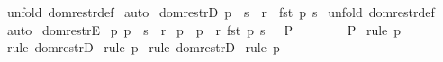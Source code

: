 \begin{isabellebody}
%
\isadelimproof
%
\endisadelimproof
%
\isatagproof
{}\isamarkupfalse%
\ {\isacharparenleft}unfold\ dom{\isacharunderscore}restr{\isacharunderscore}def{\isacharparenright}\isanewline
{}\isamarkupfalse%
\ auto\isanewline
{}\isamarkupfalse%
%
\endisatagproof
{\isafoldproof}%
%
\isadelimproof
\isanewline
%
\endisadelimproof
\isanewline
{}\isamarkupfalse%
\ dom{\isacharunderscore}restrD{}{\isacharcolon}\ {\isachardoublequoteopen}p\ {\isacharcolon}\ {\isacharparenleft}s\ {\isacharless}{\isacharcolon}\ r{\isacharparenright}\ {\isacharequal}{\isacharequal}{\isachargreater}\ fst\ p\ {\isacharcolon}s{\isachardoublequoteclose}\isanewline
%
\isadelimproof
%
\endisadelimproof
%
\isatagproof
{}\isamarkupfalse%
\ {\isacharparenleft}unfold\ dom{\isacharunderscore}restr{\isacharunderscore}def{\isacharparenright}\isanewline
{}\isamarkupfalse%
\ auto\isanewline
{}\isamarkupfalse%
%
\endisatagproof
{\isafoldproof}%
%
\isadelimproof
\isanewline
%
\endisadelimproof
\isanewline
{}\isamarkupfalse%
\ dom{\isacharunderscore}restrE{}{\isacharcolon}\isanewline
{}\ p{}{\isacharcolon}\ {\isachardoublequoteopen}p\ {\isacharcolon}\ {\isacharparenleft}s\ {\isacharless}{\isacharcolon}\ r{\isacharparenright}{\isachardoublequoteclose}\isanewline
{}\ p{}{\isacharcolon}\ {\isachardoublequoteopen}{\isacharbrackleft}{\isacharbar}\ p\ {\isacharcolon}\ r{\isacharsemicolon}\ fst\ p\ {\isacharcolon}s\ {\isacharbar}{\isacharbrackright}\ {\isacharequal}{\isacharequal}{\isachargreater}\ P\ {\isachardoublequoteclose}\isanewline
{}\ \ \ \ \ \ \ {\isachardoublequoteopen}P{\isachardoublequoteclose}\isanewline
%
\isadelimproof
%
\endisadelimproof
%
\isatagproof
{}\isamarkupfalse%
\ {\isacharparenleft}rule\ p{}{\isacharparenright}\isanewline
{}\isamarkupfalse%
\ {\isacharparenleft}rule\ dom{\isacharunderscore}restrD{}{\isacharparenright}\isanewline
{}\isamarkupfalse%
\ {\isacharparenleft}rule\ p{}{\isacharparenright}\isanewline
{}\isamarkupfalse%
\ {\isacharparenleft}rule\ dom{\isacharunderscore}restrD{}{\isacharparenright}\isanewline
{}\isamarkupfalse%
\ {\isacharparenleft}rule\ p{}{\isacharparenright}\isanewline
{}\isamarkupfalse%
%
\endisatagproof
{\isafoldproof}%
%
\isadelimproof
\isanewline
%
\endisadelimproof
\isanewline
\isanewline

\end{isabellebody}
